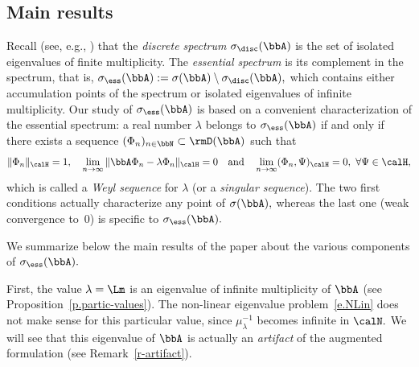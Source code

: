 \subsection{Main results}\label{s-main-results}
Recall (see, e.g., \cite{Edm-Eva-87}) that the \emph{discrete spectrum} $\sigma_{\disc}(\bbA)$ is the set of isolated eigenvalues of finite multiplicity. The \emph{essential spectrum} is its complement in the spectrum, that is, $\sigma_{\ess}(\bbA) := \sigma(\bbA) \setminus \sigma_{\disc}(\bbA),$ which contains either accumulation points of the spectrum or isolated eigenvalues of infinite multiplicity. Our study of $\sigma_{\ess}(\bbA)$ is based on a convenient characterization of the essential spectrum: a real number $\lambda$ belongs to $\sigma_{\ess}(\bbA)$ if and only if there exists a sequence $(\Phi_n)_{n \in \bbN} \subset \rmD(\bbA)$ such that
\begin{equation*}
\| \Phi_n \|_\calH = 1, \quad
\lim_{n\to\infty} \| \bbA \Phi_n - \lambda \Phi_n \|_\calH = 0
\quad\text{and}\quad
\lim_{n\to\infty} (\Phi_n,\Psi)_\calH = 0, \ \forall\Psi\in\calH,
\end{equation*}
which is called a \emph{Weyl sequence} for $\lambda$ (or a \emph{singular sequence}). The two first conditions actually characterize any point of $\sigma(\bbA),$ whereas the last one (weak convergence to~$0$) is specific to $\sigma_{\ess}(\bbA).$

We summarize below the main results of the paper about the various components of $\sigma_{\ess}(\bbA).$

First, the value $\lambda = \Lm$ is an eigenvalue of infinite multiplicity of $\bbA$ (see Proposition~\ref{p.partic-values}). The non-linear eigenvalue problem~\eqref{e.NLin} does not make sense for this particular value, since $\mu_\lambda^{-1}$ becomes infinite in $\calN.$ We will see that this eigenvalue of $\bbA$ is actually an \emph{artifact} of the augmented formulation (see Remark~\ref{r-artifact}).

